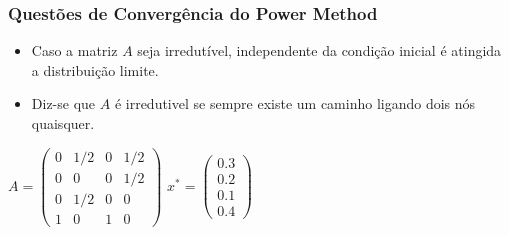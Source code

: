 \documentclass{beamer}
\begin{document}
\begin{frame}
	\frametitle{Questões de Convergência do Power Method}

\begin{itemize}
\item Caso a matriz $A$ seja irredutível, independente da condição inicial é atingida a distribuição limite.
\vspace{0.2cm}
\item Diz-se que $A$ é irredutivel se sempre existe um caminho ligando dois nós quaisquer.
\end{itemize}

\vspace{0.1cm}

\begin{center}
$A = \begin{pmatrix}
 0 & 1/2 & 0 & 1/2 \\
 0 &  0  & 0 & 1/2 \\
 0 & 1/2 & 0 &  0  \\
 1 &  0  & 1 &  0
\end{pmatrix}$
\hspace{1cm}
$x^* = \begin{pmatrix}
 0.3\\
 0.2\\
 0.1\\
 0.4
\end{pmatrix}$
\end{center}


\end{frame}
\end{document}
